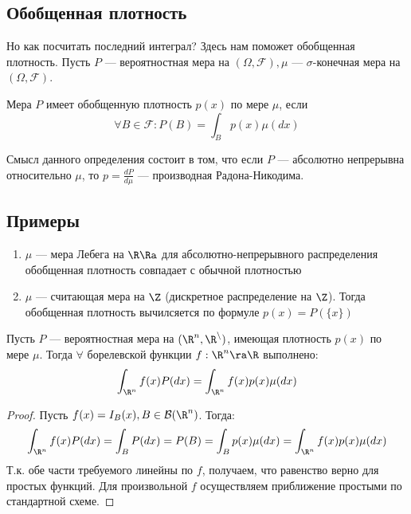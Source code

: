 \subsection{Обобщенная плотность}

Но как посчитать последний интеграл? Здесь нам поможет обобщенная плотность. Пусть \(P\) --- вероятностная мера на \((\Omega, \mathcal{F}), \mu\) --- \(\sigma\)-конечная мера на \((\Omega, \mathcal{F})\).

\begin{definition}
    Мера \(P\) имеет обобщенную плотность \(p(x)\) по мере \(\mu\), если
    \[\forall B \in \mathcal{F}: P(B) = \int_B p(x)\mu(dx)\]
\end{definition}

Смысл данного определения состоит в том, что если \(P\) --- абсолютно непрерывна относительно \(\mu\), то \(p = \frac{dP}{d\mu}\) --- производная Радона-Никодима.

\subsection{Примеры}

\begin{enumerate}
    \item \(\mu\) --- мера Лебега на \(\R \Ra\) для абсолютно-непрерывного распределения обобщенная плотность совпадает с обычной плотностью
    \item \(\mu\) --- считающая мера на \(\Z\) (дискретное распределение на \(\Z\)). Тогда обобщенная плотность вычилсяется по формуле \(p(x) = P(\{x\})\)
\end{enumerate}

\begin{theorem}
    Пусть \(P\) --- вероятностная мера на \((\R^n, \mathcal{\R^n})\), имеющая плотность \(p(x)\) по мере \(\mu\). Тогда \(\forall\) борелевской функции \(f: \R^n \ra \R\) выполнено:
    \[\int_{\R^n} f(x)P(dx) = \int_{\R^n} f(x)p(x)\mu(dx)\]
\end{theorem}
\begin{proof}
    Пусть \(f(x) = I_B(x), B \in \mathcal{B}(\R^n)\). Тогда:
    \[\int_{\R^n} f(x) P(dx) = \int_B P(dx) = P(B) = \int_B p(x)\mu(dx) = \int_{\R^n} f(x)p(x)\mu(dx)\]
    Т.к. обе части требуемого линейны по \(f\), получаем, что равенство верно для простых функций. Для произвольной \(f\) осуществляем приближение простыми по стандартной схеме.
\end{proof}

